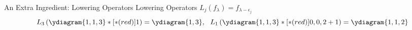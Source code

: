 \documentclass{beamer}
\newcommand{\mynone}{\ }
\begin{document}
\begin{frame}{An Extra Ingredient: Lowering Operators}
   Lowering Operators 
     \(L_j(f_\lambda) = f_{\lambda-\epsilon_j}\)
            \[ L_3\left( \ydiagram{1,1,3}*[*(red)]{1} \right) =
              \ydiagram{1,3}, \ \ L_{1}\left( \ydiagram{1,1,3}*[*(red)]{0,0,2+1} \right)
              = \ydiagram{1,1,2}
              \]
\end{frame}
\end{document}
